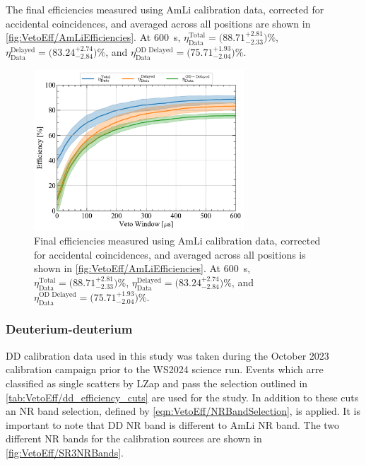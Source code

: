 The final efficiencies measured using AmLi calibration data, corrected for accidental coincidences, and averaged across all positions are shown in \autoref{fig:VetoEff/AmLiEfficiencies}. At 600~\textmu s, $\eta^\text{Total}_\text{Data}=\big(88.71^{+2.81}_{-2.33}\big)\%$, $\eta^\text{Delayed}_\text{Data}=\big(83.24^{+2.74}_{-2.84}\big)\%$, and $\eta^\text{OD Delayed}_\text{Data}=\big(75.71^{+1.93}_{-2.04}\big)\%$.

\begin{figure}[!ht]
    \centering
    \includegraphics[width=0.7\textwidth]{figures/VetoEfficiency/AmLiEfficiencies_Data.pdf}
    \caption{Final efficiencies measured using AmLi calibration data, corrected for accidental coincidences, and averaged across all positions is shown in \autoref{fig:VetoEff/AmLiEfficiencies}. At 600~\textmu s, $\eta^\text{Total}_\text{Data}=\big(88.71^{+2.81}_{-2.33}\big)\%$, $\eta^\text{Delayed}_\text{Data}=\big(83.24^{+2.74}_{-2.84}\big)\%$, and $\eta^\text{OD Delayed}_\text{Data}=\big(75.71^{+1.93}_{-2.04}\big)\%$.}
    \label{fig:VetoEff/AmLiEfficiencies}
\end{figure}

\subsubsection{Deuterium-deuterium}
DD calibration data used in this study was taken during the October 2023 calibration campaign prior to the WS2024 science run. Events which arre classified as single scatters by LZap and pass the selection outlined in \autoref{tab:VetoEff/dd_efficiency_cuts} are used for the study. In addition to these cuts an NR band selection, defined by \autoref{eqn:VetoEff/NRBandSelection}, is applied. It is important to note that DD NR band is different to AmLi NR band. The two different NR bands for the calibration sources are shown in \autoref{fig:VetoEff/SR3NRBands}.

